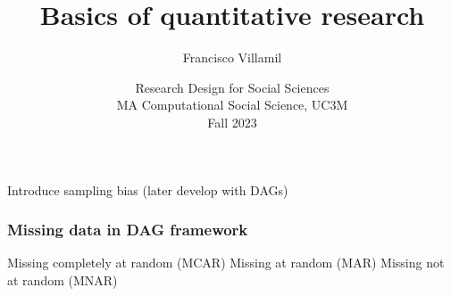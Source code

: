 \documentclass[aspectratio=43]{beamer}
\title[Lecture 2: Basics of quantitative research]{\Large Basics of quantitative research}
\author[]{Francisco Villamil}
\date[]{Research Design for Social Sciences\\MA Computational Social Science, UC3M\\Fall 2023}
\begin{document}

\begin{frame}
  \titlepage
\end{frame}


\begin{frame}
\frametitle{}
\centering

Introduce sampling bias (later develop with DAGs)

\begin{frame}
\frametitle{Missing data in DAG framework}
\centering

Missing completely at random (MCAR)
Missing at random (MAR)
Missing not at random (MNAR)

\end{frame}

\end{frame}


\end{document}
